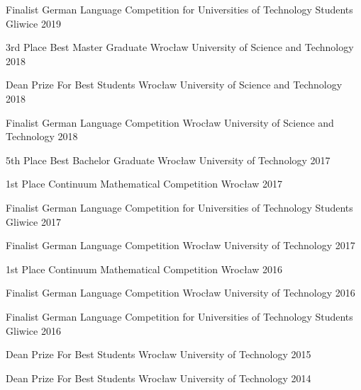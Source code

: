 
\begin{cvhonors}

    \cvhonor
    {Finalist}
    {German Language Competition for Universities of Technology Students}
    {Gliwice}
    {2019}

    \cvhonor
    {3rd Place}
    {Best Master Graduate}
    {Wrocław University of Science and Technology}
    {2018}

    \cvhonor
    {Dean Prize}
    {For Best Students}
    {Wrocław University of Science and Technology}
    {2018}

    \cvhonor
    {Finalist}
    {German Language Competition}
    {Wrocław University of Science and Technology}
    {2018}

    \cvhonor
    {5th Place}
    {Best Bachelor Graduate}
    {Wrocław University of Technology}
    {2017}

    \cvhonor
    {1st Place}
    {Continuum Mathematical Competition}
    {Wrocław}
    {2017}

    \cvhonor
    {Finalist}
    {German Language Competition for Universities of Technology Students}
    {Gliwice}
    {2017}

    \cvhonor
    {Finalist}
    {German Language Competition}
    {Wrocław University of Technology}
    {2017}

    \cvhonor
    {1st Place}
    {Continuum Mathematical Competition}
    {Wrocław}
    {2016}

    \cvhonor
    {Finalist}
    {German Language Competition}
    {Wrocław University of Technology}
    {2016}

    \cvhonor
    {Finalist}
    {German Language Competition for Universities of Technology Students}
    {Gliwice}
    {2016}

    \cvhonor
    {Dean Prize}
    {For Best Students}
    {Wrocław University of Technology}
    {2015}

    \cvhonor
    {Dean Prize}
    {For Best Students}
    {Wrocław University of Technology}
    {2014}

\end{cvhonors}
